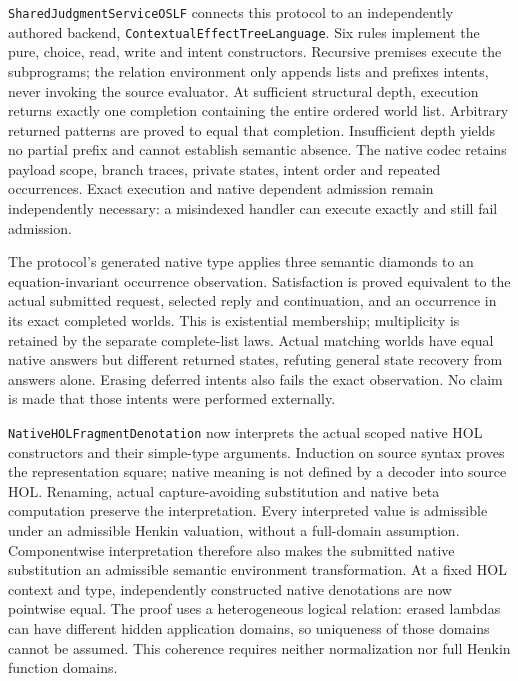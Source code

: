 \documentclass[11pt]{article}
\theoremstyle{definition}
\theoremstyle{remark}
\begin{document}
\texttt{SharedJudgmentServiceOSLF} connects this protocol to an independently
authored backend, \texttt{ContextualEffectTreeLanguage}. Six rules implement the pure,
choice, read, write and intent constructors. Recursive premises execute the
subprograms; the relation environment only appends lists and prefixes intents,
never invoking the source evaluator. At sufficient structural depth, execution
returns exactly one completion containing the entire ordered world list.
Arbitrary returned patterns are proved to equal that completion. Insufficient
depth yields no partial prefix and cannot establish semantic absence.
The native codec retains payload scope, branch traces, private states,
intent order and repeated occurrences. Exact execution and native dependent
admission remain independently necessary: a misindexed handler can execute
exactly and still fail admission.

The protocol's generated native type applies three semantic diamonds to an
equation-invariant occurrence observation. Satisfaction is proved equivalent
to the actual submitted request, selected reply and continuation, and an
occurrence in its exact completed worlds. This is existential membership;
multiplicity is retained by the separate complete-list laws. Actual matching
worlds have equal native answers but different returned states, refuting
general state recovery from answers alone. Erasing deferred intents also
fails the exact observation. No claim is made that those intents were
performed externally.

\texttt{NativeHOLFragmentDenotation} now interprets the actual scoped native
HOL constructors and their simple-type arguments. Induction on source syntax
proves the representation square; native meaning is not defined by a decoder
into source HOL. Renaming, actual capture-avoiding substitution and native
beta computation preserve the interpretation. Every interpreted value is
admissible under an admissible Henkin valuation, without a full-domain
assumption. Componentwise interpretation therefore also makes the submitted
native substitution an admissible semantic environment transformation.
At a fixed HOL context and type, independently constructed native denotations
are now pointwise equal. The proof uses a heterogeneous logical relation:
erased lambdas can have different hidden application domains, so uniqueness
of those domains cannot be assumed. This coherence requires neither
normalization nor full Henkin function domains.
\end{document}
